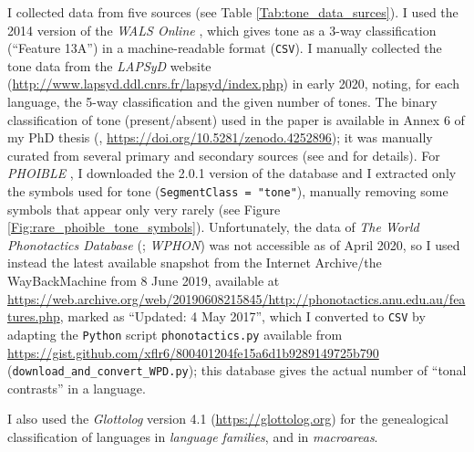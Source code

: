 \documentclass[twoside,onecolumn]{article}
\begin{document}
I collected data from five sources (see Table \ref{Tab:tone_data_surces}).
I used the 2014 version of the \textit{WALS Online} \citep{dryer_wals_2013}, which gives tone as a 3-way classification (``Feature 13A'') in a machine-readable format (\texttt{CSV}).
I manually collected the tone data from the \textit{LAPSyD} website (\url{http://www.lapsyd.ddl.cnrs.fr/lapsyd/index.php}) in early 2020, noting, for each language, the 5-way classification and the given number of tones.
The binary classification of tone (present/absent) used in the \citet{dediu_ladd_2007} paper is available in Annex 6 of my PhD thesis (\citealp{dediu_phd_2007}, \url{https://doi.org/10.5281/zenodo.4252896}); it was manually curated from several primary and secondary sources (see \citealp{dediu_phd_2007} and \citealp{dediu_phd_2007} for details).
For \textit{PHOIBLE} \citep{moran_phoible_2014}, I downloaded the 2.0.1 version of the database and I extracted only the symbols used for tone (\texttt{SegmentClass = "tone"}), manually removing some symbols that appear only very rarely (see Figure \ref{Fig:rare_phoible_tone_symbols}).
Unfortunately, the data of \textit{The World Phonotactics Database} (\citealp{donohue_world_2013}; \textit{WPHON}) was not accessible as of April 2020, so I used instead the latest available snapshot from the Internet Archive/the WayBackMachine from 8 June 2019, available at \url{https://web.archive.org/web/20190608215845/http://phonotactics.anu.edu.au/features.php}, marked as ``Updated: 4 May 2017'', which I converted to \texttt{CSV} by adapting the \texttt{Python} script \texttt{phonotactics.py} available from \url{https://gist.github.com/xflr6/800401204fe15a6d1b9289149725b790} (\verb|download_and_convert_WPD.py|); this database gives the actual number of ``tonal contrasts'' in a language.

I also used the \textit{Glottolog} \citep{hammarstrom_glottolog_2018} version 4.1 (\url{https://glottolog.org}) for the genealogical classification of languages in \emph{language families}, and in \textit{macroareas}.
\end{document}
